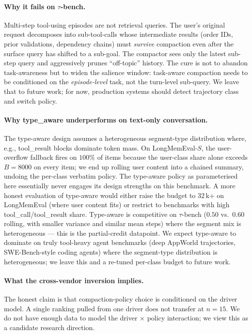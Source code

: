 \documentclass{article}
\begin{document}
\paragraph{Why it fails on $\tau$-bench.}
Multi-step tool-using episodes are not retrieval queries. The user's
original request decomposes into sub-tool-calls whose intermediate
results (order IDs, prior validations, dependency chains) must
\emph{survive} compaction even after the surface query has shifted to a
sub-goal. The compactor sees only the latest sub-step query and
aggressively prunes ``off-topic'' history. The cure is not to abandon
task-awareness but to widen the salience window: task-aware compaction
needs to be conditioned on the \emph{episode-level} task, not the
turn-level sub-query. We leave that to future work; for now, production
systems should detect trajectory class and switch policy.

\paragraph{Why \textsf{type\_aware} underperforms on text-only conversation.}
The type-aware design assumes a heterogeneous segment-type distribution
where, e.g., \textsf{tool\_result} blocks dominate token mass. On
LongMemEval-$S$, the user-overflow fallback fires on $100\%$ of items
because the user-class share alone exceeds $B{=}8000$ on every item; we
end up rolling user content into a chained summary, undoing the
per-class verbatim policy. The type-aware policy as parameterised
here essentially never engages its design strengths on this benchmark.
A more honest evaluation of type-aware would either raise the budget
to $32$\,k$+$ on LongMemEval (where user content fits) or restrict to
benchmarks with high \textsf{tool\_call}/\textsf{tool\_result} share.
Type-aware is competitive on $\tau$-bench ($0.50$ vs.\ $0.60$
rolling, with smaller variance and similar mean steps) where the
segment mix is heterogeneous --- this is the partial-credit datapoint.
We expect type-aware to dominate on truly tool-heavy agent benchmarks
(deep AppWorld trajectories, SWE-Bench-style coding agents) where the
segment-type distribution is heterogeneous; we leave this and a
re-tuned per-class budget to future work.

\paragraph{What the cross-vendor inversion implies.}
The honest claim is that compaction-policy choice is conditioned on
the driver model. A single ranking pulled from one driver does not
transfer at $n{=}15$. We do not have enough data to model the driver
$\times$ policy interaction; we view this as a candidate research
direction.
\end{document}
